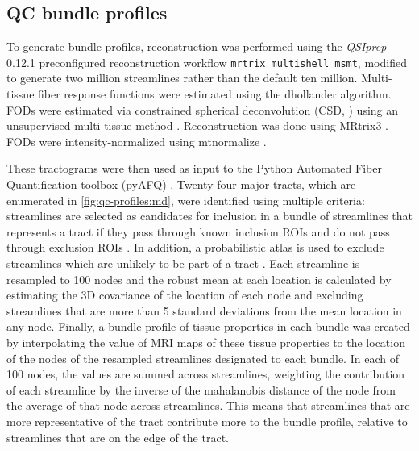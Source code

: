\documentclass[fleqn,10pt]{wlscirep}
\begin{document}
\subsection*{QC bundle profiles}

To generate bundle profiles, reconstruction was performed using the
\emph{QSIprep} 0.12.1 preconfigured reconstruction workflow
\texttt{mrtrix\_multishell\_msmt}, modified to generate two million streamlines
rather than the default ten million.  Multi-tissue fiber response functions were
estimated using the dhollander algorithm. FODs were estimated via constrained
spherical deconvolution (CSD, \cite{originalcsd, tournier2008csd}) using an
unsupervised multi-tissue method \cite{dhollander2019response,
dhollander2016unsupervised}. Reconstruction was done using MRtrix3
\cite{mrtrix3}. FODs were intensity-normalized using mtnormalize
\cite{mtnormalize}.

These tractograms were then used as input to the Python Automated Fiber
Quantification toolbox (pyAFQ) \cite{kruper2021evaluating}.  Twenty-four major
tracts, which are enumerated in \ref{fig:qc-profiles:md}, were identified using
multiple criteria: streamlines are selected as candidates for inclusion in a
bundle of streamlines that represents a tract if they pass through known
inclusion ROIs and do not pass through exclusion ROIs \cite{Wakana2007-nw}. In
addition, a probabilistic atlas is used to exclude streamlines which are
unlikely to be part of a tract \cite{Hua2008-di}. Each streamline is resampled
to 100 nodes and the robust mean at each location is calculated by estimating
the 3D covariance of the location of each node and excluding streamlines that
are more than 5 standard deviations from the mean location in any node. Finally,
a bundle profile of tissue properties in each bundle was created by
interpolating the value of MRI maps of these tissue properties to the location
of the nodes of the resampled streamlines designated to each bundle. In each of
100 nodes, the values are summed across streamlines, weighting the contribution
of each streamline by the inverse of the mahalanobis distance of the node from
the average of that node across streamlines. This means that streamlines that
are more representative of the tract contribute more to the bundle profile,
relative to streamlines that are on the edge of the tract.
\end{document}
